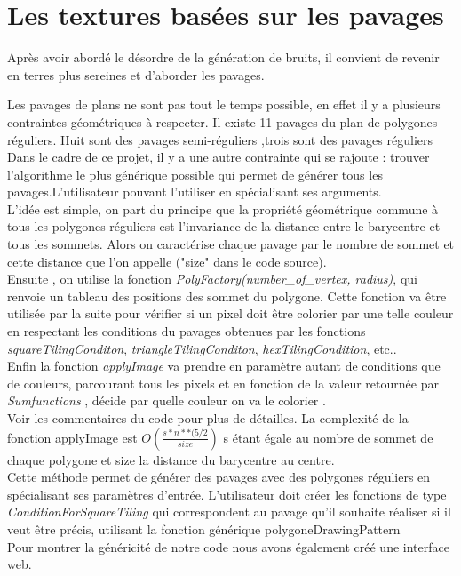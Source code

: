 \documentclass[a4paper,10pt]{article}
\begin{document}
\section{ Les textures basées sur les pavages}
Après avoir abordé le désordre de la génération de bruits, il convient de revenir en terres plus sereines et d'aborder les pavages.

Les pavages de plans ne sont pas tout le temps possible, en effet il y a plusieurs contraintes géométriques à respecter. Il existe 11 pavages du plan de polygones réguliers. Huit sont des pavages semi-réguliers ,trois sont des pavages réguliers  \\

Dans le cadre de ce projet, il y a une autre contrainte qui se rajoute :
trouver l'algorithme le plus générique possible qui permet de générer tous les pavages.L'utilisateur pouvant l'utiliser en spécialisant ses arguments.\\

L'idée est simple, on part du principe que la propriété géométrique commune à tous les polygones réguliers est l'invariance de la distance entre le barycentre et tous les sommets. Alors on caractérise chaque pavage par le nombre de sommet et cette distance que l'on appelle ("size" dans le code source). \\
Ensuite , on utilise la fonction \textit{PolyFactory(number\_of\_vertex, radius)}, qui renvoie un tableau des positions des sommet du polygone. Cette fonction va être utilisée par la suite pour vérifier si un pixel doit être colorier par une telle couleur en respectant les conditions du pavages obtenues par les fonctions \textit{squareTilingConditon}, \textit{triangleTilingConditon}, \textit{hexTilingCondition}, etc.. \\

Enfin la fonction \textit{applyImage} va prendre en paramètre autant de conditions que de couleurs, parcourant tous les pixels et en fonction de la valeur retournée par  \textit{Sumfunctions} , décide par quelle couleur on va le colorier .
\\
Voir les commentaires du code pour plus de détailles.
La complexité de la fonction applyImage est $O(\frac{s*n**(5/2}{size})$  s étant égale au nombre de sommet de chaque polygone et size la distance du barycentre au centre.
\\
Cette méthode permet de générer des pavages avec des polygones réguliers en spécialisant ses paramètres d'entrée. L'utilisateur doit créer les fonctions de type \textit{ConditionForSquareTiling} qui correspondent au pavage qu'il souhaite réaliser si il veut être précis, utilisant la fonction générique polygoneDrawingPattern\\
Pour montrer la généricité de notre code nous avons également créé une interface web.
\end{document}

